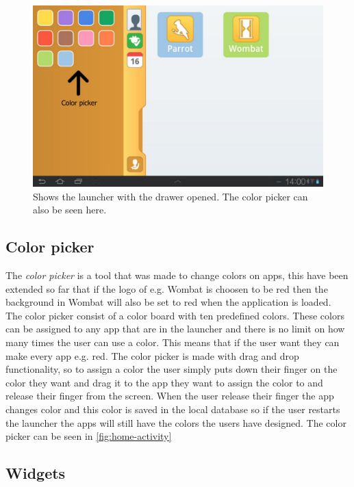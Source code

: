 \begin{figure}[h!]
	\centering
	\includegraphics[scale=0.2]{gfx/home-activity_open}
	\caption{Shows the launcher with the drawer opened. The color picker can also be seen here.}
	\label{fig:home-activity}
\end{figure}

\subsection{Color picker}\label{home:colorpicker}

The \textit{color picker} is a tool that was made to change colors on apps, this have been extended so far that if the logo of e.g. Wombat is choosen to be red then the background in Wombat will also be set to red when the application is loaded.
The color picker consist of a color board with ten predefined \giraf[] colors. These colors can be assigned to any app that are in the launcher and there is no limit on how many times the user can use a color. This means that if the user want they can make every app e.g. red.
The color picker is made with drag and drop functionality, so to assign a color the user simply puts down their finger on the color they want and drag it to the app they want to assign the color to and release their finger from the screen.
When the user release their finger the app changes color and this color is saved in the local database so if the user restarts the launcher the apps will still have the colors the users have designed. 
The color picker can be seen in \autoref{fig:home-activity}


\subsection{Widgets}

